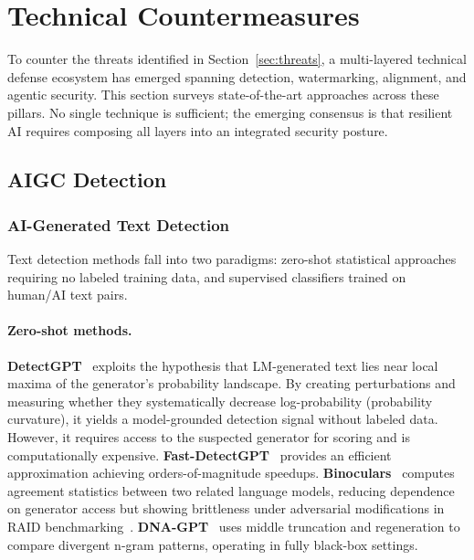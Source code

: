 
\section{Technical Countermeasures}
\label{sec:countermeasures}

To counter the threats identified in Section~\ref{sec:threats}, a multi-layered technical defense ecosystem has emerged spanning detection, watermarking, alignment, and agentic security. This section surveys state-of-the-art approaches across these pillars. No single technique is sufficient; the emerging consensus is that resilient AI requires composing all layers into an integrated security posture.


\subsection{AIGC Detection}
\label{sec:detect}

\subsubsection{AI-Generated Text Detection}
\label{sec:detect-text}

Text detection methods fall into two paradigms: zero-shot statistical approaches requiring no labeled training data, and supervised classifiers trained on human/AI text pairs.

\paragraph{Zero-shot methods.}
\textbf{DetectGPT}~\cite{mitchell2023detectgpt} exploits the hypothesis that LM-generated text lies near local maxima of the generator's probability landscape. By creating perturbations and measuring whether they systematically decrease log-probability (probability curvature), it yields a model-grounded detection signal without labeled data. However, it requires access to the suspected generator for scoring and is computationally expensive. \textbf{Fast-DetectGPT}~\cite{bao2023fastdetectgpt} provides an efficient approximation achieving orders-of-magnitude speedups. \textbf{Binoculars}~\cite{hans2024binoculars} computes agreement statistics between two related language models, reducing dependence on generator access but showing brittleness under adversarial modifications in RAID benchmarking~\cite{dugan2024raid}. \textbf{DNA-GPT}~\cite{yang2023dnagpt} uses middle truncation and regeneration to compare divergent n-gram patterns, operating in fully black-box settings.

